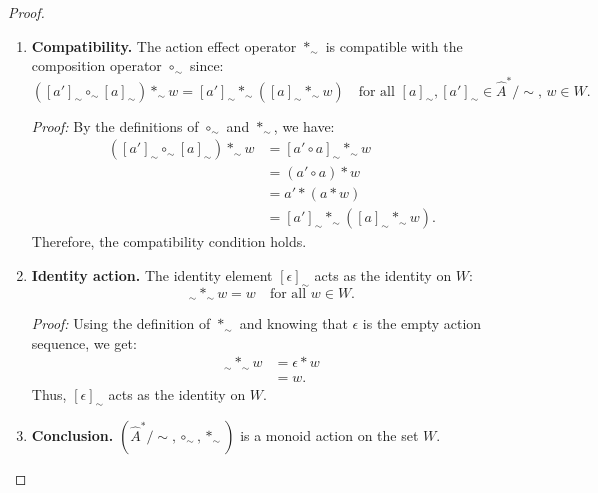 \begin{proof}
	\begin{enumerate}[(1)]
		\item \textbf{Compatibility.}
		      The action effect operator $\ast_{\sim}$ is compatible with the composition operator $\circ_{\sim}$ since:
		      \begin{equation}
			      ([a']_{\sim} \circ_{\sim} [a]_{\sim}) \ast_{\sim} w = [a']_{\sim} \ast_{\sim} ([a]_{\sim} \ast_{\sim} w) \quad \text{for all } [a]_{\sim}, [a']_{\sim} \in \hat{A}^{\ast}/\sim, \, w \in W.
		      \end{equation}

		      \textit{Proof:} By the definitions of $\circ_{\sim}$ and $\ast_{\sim}$, we have:
		      \begin{align}
			      ([a']_{\sim} \circ_{\sim} [a]_{\sim}) \ast_{\sim} w & = [a' \circ a]_{\sim} \ast_{\sim} w                   \\
			                                                          & = (a' \circ a) \ast w                                 \\
			                                                          & = a' \ast (a \ast w)                                  \\
			                                                          & = [a']_{\sim} \ast_{\sim} ([a]_{\sim} \ast_{\sim} w).
		      \end{align}
		      Therefore, the compatibility condition holds.

		\item \textbf{Identity action.}
		      The identity element $[\epsilon]_{\sim}$ acts as the identity on $W$:
		      \begin{equation}
			      [\epsilon]_{\sim} \ast_{\sim} w = w \quad \text{for all } w \in W.
		      \end{equation}

		      \textit{Proof:} Using the definition of $\ast_{\sim}$ and knowing that $\epsilon$ is the empty action sequence, we get:
		      \begin{align}
			      [\epsilon]_{\sim} \ast_{\sim} w & = \epsilon \ast w \\
			                                      & = w.
		      \end{align}
		      Thus, $[\epsilon]_{\sim}$ acts as the identity on $W$.

		\item \textbf{Conclusion.}
		      $(\hat{A}^{\ast}/\sim, \circ_{\sim}, \ast_{\sim})$ is a monoid action on the set $W$.
	\end{enumerate}
\end{proof}


